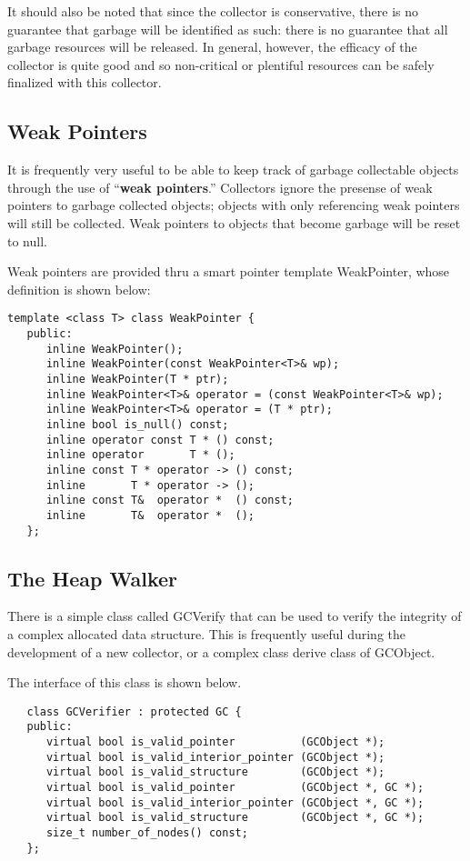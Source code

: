    It should also be noted that since the collector is conservative, there
is no guarantee that garbage will be identified as such:
there is no guarantee that all garbage resources will be released.
In general, however, the efficacy of the collector is quite good and
so non-critical or plentiful resources can be safely finalized with
this collector.

\subsection{Weak Pointers}

   It is frequently very useful to be able to keep track of garbage
collectable objects through the use of ``{\bf weak pointers}.''
Collectors ignore the presense of weak pointers to garbage collected
objects; objects with only referencing weak pointers will still be
collected.  Weak pointers to objects that become garbage will
be reset to null. 
 
   Weak pointers are provided thru a smart pointer template 
{\sf WeakPointer}, whose definition is shown below: 

\begin{verbatim}
template <class T> class WeakPointer {
   public:
      inline WeakPointer();
      inline WeakPointer(const WeakPointer<T>& wp); 
      inline WeakPointer(T * ptr); 
      inline WeakPointer<T>& operator = (const WeakPointer<T>& wp);
      inline WeakPointer<T>& operator = (T * ptr);
      inline bool is_null() const;
      inline operator const T * () const;
      inline operator       T * ();
      inline const T * operator -> () const;
      inline       T * operator -> ();
      inline const T&  operator *  () const;
      inline       T&  operator *  ();
   };
\end{verbatim}

\subsection{The Heap Walker}

   There is a simple class called {\sf GCVerify} that can be used
to verify the integrity of a complex allocated data structure.
This is frequently useful during the development of a new collector,
or a complex class derive class of {\sf GCObject.}  

   The interface of this class is shown below.

\begin{verbatim}
   class GCVerifier : protected GC {
   public:
      virtual bool is_valid_pointer          (GCObject *);
      virtual bool is_valid_interior_pointer (GCObject *);
      virtual bool is_valid_structure        (GCObject *);
      virtual bool is_valid_pointer          (GCObject *, GC *);
      virtual bool is_valid_interior_pointer (GCObject *, GC *);
      virtual bool is_valid_structure        (GCObject *, GC *);
      size_t number_of_nodes() const;
   };
\end{verbatim}


